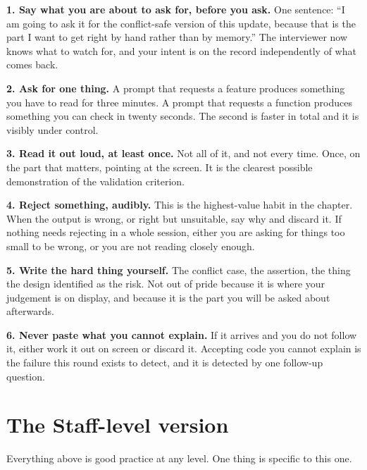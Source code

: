 \begin{kitmethod}
\textbf{1. Say what you are about to ask for, before you ask.} One sentence:
``I am going to ask it for the conflict-safe version of this update, because
that is the part I want to get right by hand rather than by memory.'' The
interviewer now knows what to watch for, and your intent is on the record
independently of what comes back.

\textbf{2. Ask for one thing.} A prompt that requests a feature produces
something you have to read for three minutes. A prompt that requests a function
produces something you can check in twenty seconds. The second is faster in
total and it is visibly under control.

\textbf{3. Read it out loud, at least once.} Not all of it, and not every time.
Once, on the part that matters, pointing at the screen. It is the clearest
possible demonstration of the validation criterion.

\textbf{4. Reject something, audibly.} This is the highest-value habit in the
chapter. When the output is wrong, or right but unsuitable, say why and
discard it. If nothing needs rejecting in a whole session, either you are
asking for things too small to be wrong, or you are not reading closely enough.

\textbf{5. Write the hard thing yourself.} The conflict case, the assertion,
the thing the design identified as the risk. Not out of pride \dash{} because
it is where your judgement is on display, and because it is the part you will
be asked about afterwards.

\textbf{6. Never paste what you cannot explain.} If it arrives and you do not
follow it, either work it out on screen or discard it. Accepting code you
cannot explain is the failure this round exists to detect, and it is detected
by one follow-up question.
\end{kitmethod}

\section{The Staff-level version}

Everything above is good practice at any level. One thing is specific to this
one.


